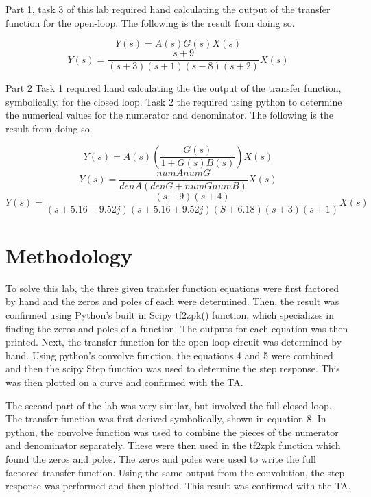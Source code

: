 \documentclass[12pt, titlepage]{article}
\begin{document}
    Part 1, task 3 of this lab required hand calculating the output of the transfer function for the open-loop.  The following is the result from doing so.
    
    \begin{equation}
        \nonumber
        Y(s) = A(s)G(s)X(s)
    \end{equation}
    \begin{equation}
        Y(s) = \frac{s+9}{(s+3)(s+1)(s-8)(s+2)}X(s)
    \end{equation}
    
    Part 2 Task 1 required hand calculating the the output of the transfer function, symbolically, for the closed loop. Task 2 the required using python to determine the numerical values for the numerator and denominator. The following is the result from doing so.
    
    \begin{equation}
        Y(s) = A(s)(\frac{G(s)}{1+G(s)B(s)})X(s)
        \nonumber
    \end{equation}
    \begin{equation}
        Y(s) = \frac{numAnumG}{denA(denG+numGnumB)}X(s)
    \end{equation}
    \begin{equation}
        Y(s)=\frac{(s+9)(s+4)}{(s+5.16-9.52j)(s+5.16+9.52j)(S+6.18)(s+3)(s+1)}X(s)
    \end{equation}
    
    
    \section{Methodology}
    To solve this lab, the three given transfer function  equations were first factored by hand and the zeros and poles of each were determined.  Then, the result was confirmed using Python's built in Scipy tf2zpk() function, which specializes in finding the zeros and poles of a function. The outputs for each equation was then printed.  Next, the transfer function for the open loop circuit was determined by hand.  Using python's convolve function, the equations 4 and 5 were combined and then the scipy Step function was used to determine the step response.  This was then plotted on a curve and confirmed with the TA.
    
    The second part of the lab was very similar, but involved the full closed loop.  The transfer function was first derived symbolically, shown in equation 8.  In python, the convolve function was used to combine the pieces of the numerator and denominator separately.  These were then used in the tf2zpk function which found the zeros and poles.  The zeros and poles were used to write the full factored transfer function.  Using the same output from the convolution, the step response was performed and then plotted.  This result was confirmed with the TA.
    
\end{document}
